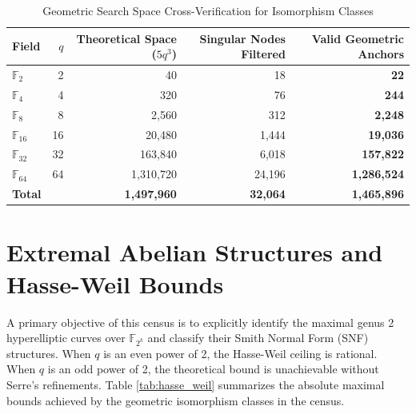 \documentclass[letterpaper, 11pt]{article}
\begin{document}
	\begin{table}[h]
		\centering
		\caption{Geometric Search Space Cross-Verification for Isomorphism Classes}
		\label{tab:geometric_space}
		\begin{tabular}{lrrrr}
			\toprule
			Field & $q$ & Theoretical Space ($5q^3$) & Singular Nodes Filtered & Valid Geometric Anchors \\
			\midrule
			$\mathbb{F}_2$ & 2 & 40 & 18 & \textbf{22} \\
			$\mathbb{F}_4$ & 4 & 320 & 76 & \textbf{244} \\
			$\mathbb{F}_8$ & 8 & 2,560 & 312 & \textbf{2,248} \\
			$\mathbb{F}_{16}$ & 16 & 20,480 & 1,444 & \textbf{19,036} \\
			$\mathbb{F}_{32}$ & 32 & 163,840 & 6,018 & \textbf{157,822} \\
			$\mathbb{F}_{64}$ & 64 & 1,310,720 & 24,196 & \textbf{1,286,524} \\
			\midrule
			\textbf{Total} & & \textbf{1,497,960} & \textbf{32,064} & \textbf{1,465,896} \\
			\bottomrule
		\end{tabular}
	\end{table}
	
	\section{Extremal Abelian Structures and Hasse-Weil Bounds}
	A primary objective of this census is to explicitly identify the maximal genus 2 hyperelliptic curves over $\mathbb{F}_{2^k}$ and classify their Smith Normal Form (SNF) structures. When $q$ is an even power of 2, the Hasse-Weil ceiling is rational. When $q$ is an odd power of 2, the theoretical bound is unachievable without Serre's refinements. Table \ref{tab:hasse_weil} summarizes the absolute maximal bounds achieved by the geometric isomorphism classes in the census.
	
\end{document}
